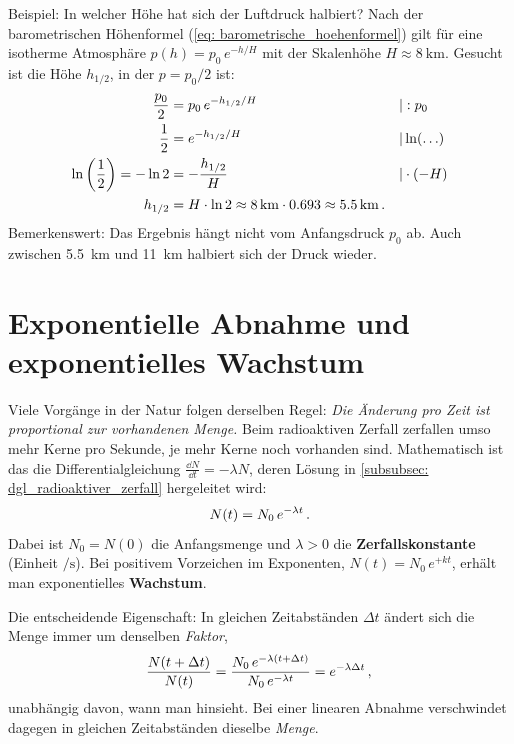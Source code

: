 \begin{examplebox}[]{Beispiel: In welcher Höhe hat sich der Luftdruck halbiert?}
    Nach der barometrischen Höhenformel (\cref{eq: barometrische_hoehenformel}) gilt für eine isotherme Atmosphäre $p(h) = p_0 \, e^{-h/H}$ mit der Skalenhöhe $H \approx \SI{8}{\kilo\meter}$. Gesucht ist die Höhe $h_{1/2}$, in der $p = p_0/2$ ist:
    \begin{align*}
        \frac{p_0}{2} &= p_0 \, e^{-h_{1/2}/H} && | : p_0 \\
        \frac{1}{2} &= e^{-h_{1/2}/H} && | \ln(\ldots) \\
        \ln\left(\frac{1}{2}\right) = -\ln 2 &= -\frac{h_{1/2}}{H} && | \cdot (-H) \\
        h_{1/2} &= H \cdot \ln 2 \approx \SI{8}{\kilo\meter} \cdot \num{0.693} \approx \SI{5.5}{\kilo\meter} \,.
    \end{align*}
    Bemerkenswert: Das Ergebnis hängt nicht vom Anfangsdruck $p_0$ ab. Auch zwischen \SI{5.5}{\kilo\meter} und \SI{11}{\kilo\meter} halbiert sich der Druck wieder.
\end{examplebox}

\section{Exponentielle Abnahme und exponentielles Wachstum}\label{sec: exponentielle_Abnahme}
Viele Vorgänge in der Natur folgen derselben Regel: \textit{Die Änderung pro Zeit ist proportional zur vorhandenen Menge.} Beim radioaktiven Zerfall zerfallen umso mehr Kerne pro Sekunde, je mehr Kerne noch vorhanden sind. Mathematisch ist das die Differentialgleichung $\frac{\dd N}{\dd t} = -\lambda N$, deren Lösung in \cref{subsubsec: dgl_radioaktiver_zerfall} hergeleitet wird:
\begin{equation}\label{eq: exponentielle_abnahme}
    N(t) = N_0 \, e^{-\lambda t} \,.
\end{equation}
Dabei ist $N_0 = N(0)$ die Anfangsmenge und $\lambda > 0$ die \textbf{Zerfallskonstante} (Einheit $\si{\per\second}$). Bei positivem Vorzeichen im Exponenten, $N(t) = N_0 \, e^{+k t}$, erhält man exponentielles \textbf{Wachstum}.

Die entscheidende Eigenschaft: In gleichen Zeitabständen $\Delta t$ ändert sich die Menge immer um denselben \textit{Faktor},
\begin{equation}
    \frac{N(t + \Delta t)}{N(t)} = \frac{N_0 \, e^{-\lambda (t + \Delta t)}}{N_0 \, e^{-\lambda t}} = e^{-\lambda \Delta t} \,{,}\,
\end{equation}
unabhängig davon, wann man hinsieht. Bei einer linearen Abnahme verschwindet dagegen in gleichen Zeitabständen dieselbe \textit{Menge}.

